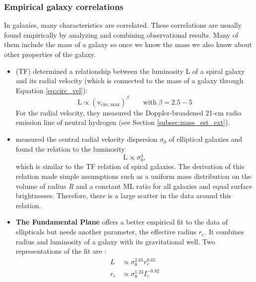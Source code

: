 \subsubsection{Empirical galaxy correlations}
In galaxies, many characteristics are correlated. These correlations are usually found empirically by analyzing and combining observational results. Many of them include the mass of a galaxy so once we know the mass we also know about other properties of the galaxy. 
\begin{itemize}
    \item \textbf{\citet{Tully...Fisher...1977}} (TF) determined a relationship between the luminosity L of a spiral galaxy and its radial velocity (which is connected to the mass of a galaxy through Equation \ref{eq:circ_vel}):
    \begin{equation}
        \mathrm{L \propto (v_{circ, max})}^\beta \qquad \mathrm{with}\ \beta =  2.5 - 5
    \end{equation}
    For the radial velocity, they measured the Doppler-broadened 21-cm radio emission line of neutral hydrogen (see Section \ref{subsec:mass_est_ext}). 
    \item \textbf{\citet{Faber...Jackson...1976}} measured the central radial velocity dispersion $\sigma_0$ of elliptical galaxies and found the relation to the luminosity  
    \begin{equation}
        \mathrm{L} \propto \sigma_0^4,
    \end{equation}
    which is similar to the \acs{TF} relation of spiral galaxies. The derivation of this relation made simple assumptions such as a uniform mass distribution on the volume of radius \textit{R} and a constant \ac{ML} ratio for all galaxies and equal surface brightnesses. Therefore, there is a large scatter in the data around this relation.
    \item \textbf{The Fundamental Plane} offers a better empirical fit to the data of ellipticals but needs another parameter, the effective radius $r_e$. It combines radius and luminosity of a galaxy with its gravitational well. Two representations of the fit are \citep{Carroll...Ostlie..2006}:
    \begin{align}
        L &\propto \sigma_0^{2.65}r_e^{0.65} \\
        r_e &\propto \sigma_0^{1.24}I_e^{-0.82}
    \end{align}
    \iffalse\item M\_vir - N\_GC \fi
\end{itemize}

